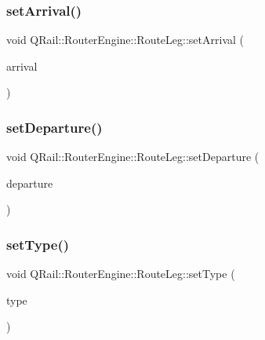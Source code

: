 \subsubsection{\texorpdfstring{setArrival()}{setArrival()}}
{\footnotesize\ttfamily void Q\+Rail\+::\+Router\+Engine\+::\+Route\+Leg\+::set\+Arrival (\begin{DoxyParamCaption}\item[{\mbox{\hyperlink{classQRail_1_1RouterEngine_1_1RouteLegEnd}{Q\+Rail\+::\+Router\+Engine\+::\+Route\+Leg\+End}} $\ast$}]{arrival }\end{DoxyParamCaption})}

\mbox{\label{classQRail_1_1RouterEngine_1_1RouteLeg_a1f478cdbe5ba2d3cb8030f40925c1525}} 
\subsubsection{\texorpdfstring{setDeparture()}{setDeparture()}}
{\footnotesize\ttfamily void Q\+Rail\+::\+Router\+Engine\+::\+Route\+Leg\+::set\+Departure (\begin{DoxyParamCaption}\item[{\mbox{\hyperlink{classQRail_1_1RouterEngine_1_1RouteLegEnd}{Q\+Rail\+::\+Router\+Engine\+::\+Route\+Leg\+End}} $\ast$}]{departure }\end{DoxyParamCaption})}

\mbox{\label{classQRail_1_1RouterEngine_1_1RouteLeg_adb34f16e6f424357f16f9be1ed780a33}} 
\subsubsection{\texorpdfstring{setType()}{setType()}}
{\footnotesize\ttfamily void Q\+Rail\+::\+Router\+Engine\+::\+Route\+Leg\+::set\+Type (\begin{DoxyParamCaption}\item[{const \mbox{\hyperlink{classQRail_1_1RouterEngine_1_1RouteLeg_af31dfcc23f2ae80f7fb0feca24cb9816}{Q\+Rail\+::\+Router\+Engine\+::\+Route\+Leg\+::\+Type}} \&}]{type }\end{DoxyParamCaption})}

